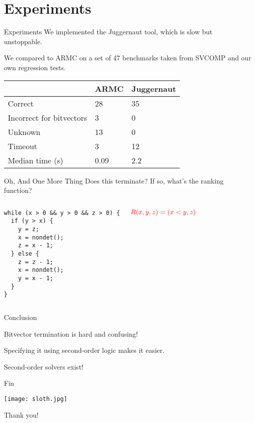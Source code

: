 \documentclass[xcolor=pdftex,t,11pt]{beamer}
\newcommand{\red}[1]{\textcolor{red}{#1}}
\begin{document}
\section{Experiments}

\begin{frame}{Experiments}
We implemented the {\sc Juggernaut} tool, which is slow but unstoppable.

\vspace{1em}

We compared to {\sc ARMC} on a set of 47 benchmarks taken from SVCOMP and our own
regression tests.

\begin{center}
 \begin{tabular}{|l||l|l|}
  \hline
  & {\sc ARMC} & {\sc Juggernaut} \\
  \hline
  \hline
  Correct & 28 & 35 \\
  Incorrect for bitvectors & 3 & 0 \\
  Unknown & 13 & 0 \\
  Timeout & 3 & 12 \\
  \hline
  Median time (s) & 0.09 & 2.2 \\
  \hline
 \end{tabular}
\end{center}
 
\end{frame}

\begin{frame}[fragile]{Oh, And One More Thing}
Does this terminate?  If so, what's the ranking function?

\begin{columns}[c]
\begin{lstlisting}[basicstyle=\normalsize]
while (x > 0 && y > 0 && z > 0) {
  if (y > x) {
    y = z;
    x = nondet();
    z = x - 1;
  } else {
    z = z - 1;
    x = nondet();
    y = x - 1;
  }
}
\end{lstlisting}

\pause
{}
$\red{R(x, y, z) = (x < y, z)}$

\end{columns}
\end{frame}


\begin{frame}{Conclusion}
\Large

  Bitvector termination is hard and confusing!

  \vspace{2em}

  Specifying it using second-order logic makes it easier.

  \vspace{2em}

  Second-order solvers exist!
  
\end{frame}


\begin{frame}[fragile]{Fin}

\begin{center}
\texttt{[image: sloth.jpg]}

\Huge
 Thank you!
\end{center}

\end{frame}
\end{document}
